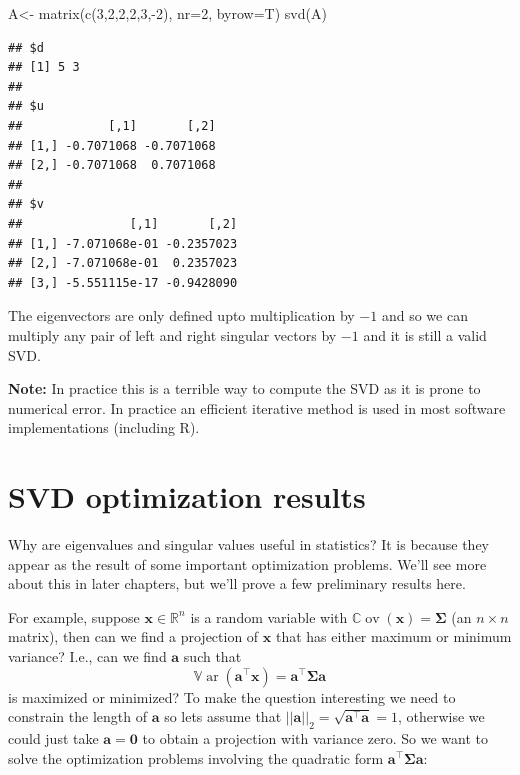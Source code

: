\documentclass[
]{book}
\newenvironment{Shaded}{\begin{snugshade}}{\end{snugshade}}
\newcommand{\AttributeTok}[1]{\textcolor[rgb]{0.77,0.63,0.00}{#1}}
\newcommand{\DecValTok}[1]{\textcolor[rgb]{0.00,0.00,0.81}{#1}}
\newcommand{\FunctionTok}[1]{\textcolor[rgb]{0.00,0.00,0.00}{#1}}
\newcommand{\NormalTok}[1]{#1}
\newcommand{\OtherTok}[1]{\textcolor[rgb]{0.56,0.35,0.01}{#1}}
\newcommand{\SpecialCharTok}[1]{\textcolor[rgb]{0.00,0.00,0.00}{#1}}
\theoremstyle{definition}
\theoremstyle{definition}
\theoremstyle{definition}
\theoremstyle{definition}
\theoremstyle{remark}
\begin{document}
\begin{Shaded}
\begin{Highlighting}[]
\NormalTok{A}\OtherTok{\textless{}{-}} \FunctionTok{matrix}\NormalTok{(}\FunctionTok{c}\NormalTok{(}\DecValTok{3}\NormalTok{,}\DecValTok{2}\NormalTok{,}\DecValTok{2}\NormalTok{,}\DecValTok{2}\NormalTok{,}\DecValTok{3}\NormalTok{,}\SpecialCharTok{{-}}\DecValTok{2}\NormalTok{), }\AttributeTok{nr=}\DecValTok{2}\NormalTok{, }\AttributeTok{byrow=}\NormalTok{T)}
\FunctionTok{svd}\NormalTok{(A)}
\end{Highlighting}
\end{Shaded}

\begin{verbatim}
## $d
## [1] 5 3
## 
## $u
##            [,1]       [,2]
## [1,] -0.7071068 -0.7071068
## [2,] -0.7071068  0.7071068
## 
## $v
##               [,1]       [,2]
## [1,] -7.071068e-01 -0.2357023
## [2,] -7.071068e-01  0.2357023
## [3,] -5.551115e-17 -0.9428090
\end{verbatim}

The eigenvectors are only defined upto multiplication by \(-1\) and so we can multiply any pair of left and right singular vectors by \(-1\) and it is still a valid SVD.

\textbf{Note:} In practice this is a terrible way to compute the SVD as it is prone to numerical error. In practice an efficient iterative method is used in most software implementations (including R).

\hypertarget{svdopt}{%
\section{SVD optimization results}\label{svdopt}}

Why are eigenvalues and singular values useful in statistics? It is because they appear as the result of some important optimization problems. We'll see more about this in later chapters, but we'll prove a few preliminary results here.

For example, suppose \(\mathbf x\in\mathbb{R}^n\) is a random variable with \({\mathbb{C}\operatorname{ov}}(\mathbf x)=\boldsymbol{\Sigma}\) (an \(n \times n\) matrix), then can we find a projection of \(\mathbf x\) that has either maximum or minimum variance? I.e., can we find \(\mathbf a\) such that \[{\mathbb{V}\operatorname{ar}}(\mathbf a^\top\mathbf x)=\mathbf a^\top \boldsymbol{\Sigma}\mathbf a\] is maximized or minimized?
To make the question interesting we need to constrain the length of \(\mathbf a\) so lets assume that \(||\mathbf a||_2 = \sqrt{\mathbf a^\top \mathbf a}=1\), otherwise we could just take \(\mathbf a=\boldsymbol 0\) to obtain a projection with variance zero. So we want to solve the optimization problems involving the quadratic form \(\mathbf a^\top \boldsymbol{\Sigma}\mathbf a\):
\end{document}
